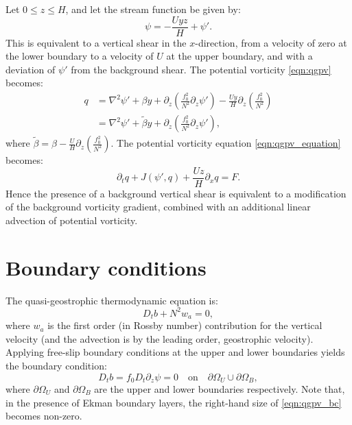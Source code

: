 \documentclass[a4paper]{book}
\begin{document}
Let $0 \leq z \leq H$, and let the stream function be given by:
\begin{equation}
  \psi = -\frac{U y z}{H} + \psi'.
\end{equation}
This is equivalent to a vertical shear in the $x$-direction, from a velocity of
zero at the lower boundary to a velocity of $U$ at the upper boundary, and with
a deviation of $\psi'$ from the background shear. The potential vorticity \eqref{eqn:qgpv}
becomes:
\begin{align}
  q & = \nabla^2 \psi' + \beta y + \partial_z \left( \frac{f_0^2}{N^2} \partial_z \psi' \right) - \frac{U y}{H} \partial_z \left( \frac{f_0^2}{N^2} \right) \nonumber \\
    & = \nabla^2 \psi' + \tilde{\beta} y + \partial_z \left( \frac{f_0^2}{N^2} \partial_z \psi' \right),
\end{align}
where $\tilde{\beta} = \beta -  \frac{U}{H} \partial_z \left( \frac{f_0^2}{N^2} \right)$. The potential vorticity
equation \eqref{eqn:qgpv_equation} becomes:
\begin{equation}
  \partial_t q + J \left( \psi', q \right) + \frac{U z}{H} \partial_x q =  F.
\end{equation}
Hence the presence of a background vertical shear is equivalent to a
modification of the background vorticity gradient, combined with an additional
linear advection of potential vorticity.

\section{Boundary conditions}\label{sect:qgpv_bc}

The quasi-geostrophic thermodynamic equation is:
\begin{equation}
  D_t b + N^2 w_a = 0,
\end{equation}
where $w_a$ is the first order (in Rossby number) contribution for the vertical
velocity (and the advection is by the leading order, geostrophic velocity).
Applying free-slip boundary conditions at the upper and lower
boundaries yields the boundary condition:
\begin{equation}\label{eqn:qgpv_bc}
  D_t b = f_0 D_t \partial_z \psi = 0 \quad \textrm{on} \quad \partial \Omega_U \cup \partial \Omega_B,
\end{equation}
where $\partial \Omega_U$ and $\partial \Omega_B$ are the upper and lower
boundaries respectively. Note that, in the presence of Ekman boundary layers,
the right-hand size of \eqref{eqn:qgpv_bc} becomes non-zero.
\end{document}
